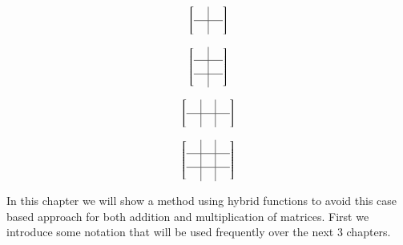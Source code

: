 \begin{figure}[ht]
	\caption[Possible block overlaps of $2 \times 2$ block matrices.]{There are 9 possible permutations. 1x (a) 2x (b) 2x (c) 4x (d)}
	\label{MatAdditionPermutations}
	\begin{subfigure}[b]{0.24\textwidth}
		\caption{}
		\begin{equation*}
			\left[ \begin{array}{c|c}
				\; & \; \\
				\hline
				& \\
			\end{array}\right]
		\end{equation*}
	\end{subfigure}
	\begin{subfigure}[b]{0.24\textwidth}
		\caption{}
		\begin{equation*}
			\left[ \begin{array}{c|c}
				\; & \; \\
				\hline
				& \\
				\hline
				& \\
			\end{array}\right]
		\end{equation*}
	\end{subfigure}
	\begin{subfigure}[b]{0.24\textwidth}
		\caption{}
		\begin{equation*}
			\left[ \begin{array}{c|c|c}
				\; & \; & \;  \\
				\hline
				& \\
			\end{array}\right]
		\end{equation*}
	\end{subfigure}
	\begin{subfigure}[b]{0.24\textwidth}
		\caption{}
		\begin{equation*}
			\left[ \begin{array}{c|c|c}
				\; & \; & \; \\
				\hline
				& \\
				\hline
				& \\
			\end{array}\right]
		\end{equation*}
	\end{subfigure}
\end{figure}


In this chapter we will show a method using hybrid functions to avoid this case based approach for both addition
and multiplication of matrices.
First we introduce some notation that will be used frequently over the next 3 chapters.

